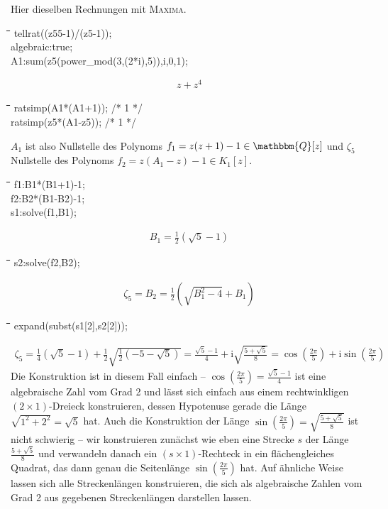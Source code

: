 \documentclass[11pt]{article}
\newcommand{\br}[1]{\ensuremath{\left(#1\right)}}
\newcommand{\ii}{\mathrm{i}}
\newcommand{\Q}{\mathbbm{Q}}
\def\pw{{\char94}}
\newenvironment{code}{\tt \begin{tabbing}
\hskip12pt\=\hskip12pt\=\hskip12pt\=\hskip12pt\=\hskip5cm\=\hskip5cm\=\kill}
{\end{tabbing}}
\begin{document}
Hier dieselben Rechnungen mit \textsc{Maxima}.
\begin{code}
tellrat((z5\pw5-1)/(z5-1));\\
algebraic:true;\\
A1:sum(z5\pw(power\_mod(3,(2*i),5)),i,0,1);
\end{code}
\begin{gather*}
  z+z^4
\end{gather*}
\begin{code}
ratsimp(A1*(A1+1));  /* 1 */\\
ratsimp(z5*(A1-z5)); /* 1 */
\end{code}
$A_1$ ist also Nullstelle des Polynoms $f_1=z(z+1)-1\in\Q[z]$ und $\zeta_5$
Nullstelle des Polynoms $f_2=z(A_1-z)-1\in K_1[z]$. 
\begin{code}
f1:B1*(B1+1)-1;   \\
f2:B2*(B1-B2)-1;  \\
s1:solve(f1,B1);
\end{code}
\begin{gather*}
  B_1 = \frac12\br{\sqrt5-1}
\end{gather*}
\begin{code}
s2:solve(f2,B2);
\end{code}
\begin{gather*}
  \zeta_5 = B_2 = \frac12\br{\sqrt{B_1^2-4}+B_1}
\end{gather*}
\begin{code}
expand(subst(s1[2],s2[2]));
\end{code}
\begin{gather*}
  \zeta_5 = \frac14\br{\sqrt5-1}+\frac12\sqrt{\frac12\br{-5-\sqrt5}}
  = \frac{\sqrt5-1}{4}+\ii\sqrt{\frac{5+\sqrt5}{8}} = \cos\br{\frac{2\pi}{5}}
  + \ii\sin\br{\frac{2\pi}{5}}
\end{gather*}
Die Konstruktion ist in diesem Fall einfach --
$\cos\br{\frac{2\pi}{5}}=\frac{\sqrt5-1}{4}$ ist eine algebraische Zahl vom
Grad 2 und lässt sich einfach aus einem rechtwinkligen $(2\times 1)$-Dreieck
konstruieren, dessen Hypotenuse gerade die Länge $\sqrt{1^2+2^2}=\sqrt{5}$
hat.  Auch die Konstruktion der Länge $\sin\br{\frac{2\pi}{5}}
=\sqrt{\frac{5+\sqrt5}{8}}$ ist nicht schwierig -- wir konstruieren zunächst
wie eben eine Strecke $s$ der Länge $\frac{5+\sqrt5}{8}$ und verwandeln danach
ein $(s\times 1)$-Rechteck in ein flächengleiches Quadrat, das dann genau die
Seitenlänge $\sin\br{\frac{2\pi}{5}}$ hat.  Auf ähnliche Weise lassen sich
alle Streckenlängen konstruieren, die sich als algebraische Zahlen vom Grad 2
aus gegebenen Streckenlängen darstellen lassen. 
\end{document}
